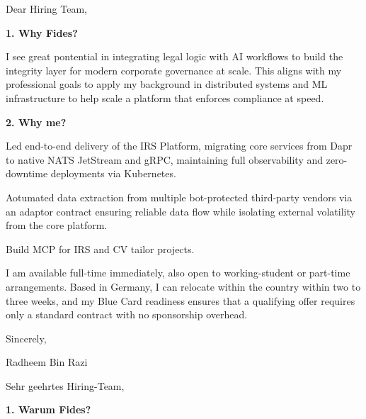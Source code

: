 \documentclass[11pt,a4paper]{coverletter}
\begin{document}

\opening{Dear Hiring Team,}

\vspace{8pt}\noindent\textbf{1. Why Fides?}\par\vspace{3pt}

I see great pontential in integrating legal logic with AI workflows to build the integrity layer for modern corporate governance at scale. This aligns with my professional goals to apply my background in distributed systems and ML infrastructure to help scale a platform that enforces compliance at speed.

\vspace{8pt}\noindent\textbf{2. Why me?}\par\vspace{3pt}

\bullets

  \item Led end-to-end delivery of the IRS Platform, migrating core services from Dapr to native NATS JetStream and gRPC, maintaining full observability and zero-downtime deployments via Kubernetes.

  \item Aotumated data extraction from multiple bot-protected third-party vendors via an adaptor contract ensuring reliable data flow while isolating external volatility from the core platform.

  \item Build MCP for IRS and CV tailor projects.

\bulletsend

I am available full-time immediately, also open to working-student or part-time arrangements. Based in Germany, I can relocate within the country within two to three weeks, and my Blue Card readiness ensures that a qualifying offer requires only a standard contract with no sponsorship overhead.

\closing{Sincerely,}{Radheem Bin Razi}

\clearpage
{}


\opening{Sehr geehrtes Hiring-Team,}

\vspace{8pt}\noindent\textbf{1. Warum Fides?}\par\vspace{3pt}
\end{document}
